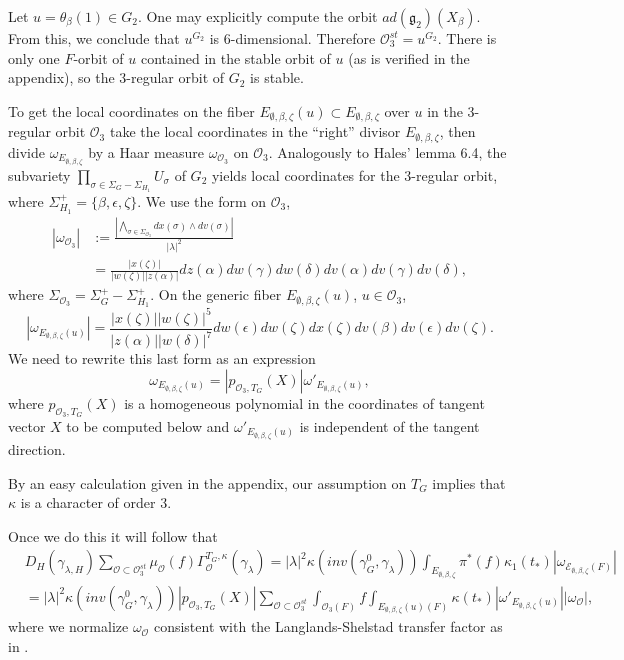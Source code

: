 \documentclass[12pt,letterpaper]{amsart}
\begin{document}
Let $u=\theta_{\beta}(1)\in G_2$.
One may explicitly compute the orbit $ad({\mathfrak g}_2)(X_\beta)$.
From this, we conclude that $u^{G_2}$
is 6-dimensional. Therefore ${\mathcal O}_3^{st}=u^{G_2}$.
There is only one $F$-orbit of $u$ contained in the stable orbit of $u$
(as is verified in the appendix), so the $3$-regular orbit
of $G_2$ is stable.

To get the local coordinates on the fiber
$E_{\emptyset,\beta,\zeta}(u)\subset E_{\emptyset,\beta,\zeta}$ over
$u$ in the 3-regular orbit ${\mathcal O}_3$ take the local
coordinates in the ``right'' divisor $E_{\emptyset,\beta,\zeta}$,
then divide $\omega_{E_{\emptyset,\beta,\zeta}}$ by a Haar measure
$\omega_{{\mathcal O}_3}$ on ${\mathcal O}_3$.
Analogously to Hales' lemma 6.4,
the subvariety $\prod_{\sigma\in \Sigma_G-\Sigma_{H_1}}U_\sigma$
of $G_2$ yields local coordinates for the $3$-regular orbit,
where $\Sigma_{H_1}^+=\{\beta,\epsilon,\zeta\}$.
We use the form on ${\mathcal O}_3$,
\[
\begin{split}
|\omega_{{\mathcal O}_3}|
&:=\frac{|\bigwedge_{\sigma\in \Sigma_{{\mathcal O}_3}}dx(\sigma)\wedge dv(\sigma)|}{|\lambda|^2}\\
&=\frac{|x(\zeta)|}{|w(\zeta)||z(\alpha)|}
dz(\alpha)dw(\gamma)dw(\delta)dv(\alpha)dv(\gamma)dv(\delta),
\end{split}
\tag{8.4}
\]
where $\Sigma_{{\mathcal O}_3}=\Sigma_{G}^+ -\Sigma_{H_1}^+$.
On the generic fiber $E_{\emptyset,\beta,\zeta}(u)$, $u\in {\mathcal O}_3$,
\[
|\omega_{E_{\emptyset,\beta,\zeta}(u)}|=
\frac{{|x(\zeta)||w(\zeta)|^5}}{{|z(\alpha)||w(\delta)|^7}}
dw(\epsilon)dw(\zeta)dx(\zeta)dv(\beta)dv(\epsilon)dv(\zeta).
\tag{8.5}
\]
We need to rewrite this last form as an expression
\[
\omega_{E_{\emptyset,\beta,\zeta}(u)}=
|p_{{\mathcal O}_3,T_G}(X)|\omega'_{E_{\emptyset,\beta,\zeta}(u)},
\]
where $p_{{\mathcal O}_3,T_G}(X)$ is a homogeneous polynomial in the coordinates
of tangent vector $X$ to be computed below
and $\omega'_{E_{\emptyset,\beta,\zeta}(u)}$
is independent of the tangent direction.

By an easy calculation given in the appendix,
our assumption on $T_G$ implies that $\kappa$ is a character
of order $3$.

Once we do this it will follow that
\[
\begin{split}
&D_H(\gamma_{\lambda,H})\sum_{{\mathcal O}\subset {\mathcal O}_3^{st}}
\mu_{\mathcal O}(f)\Gamma_{\mathcal O}^{T_G,\kappa}(\gamma_\lambda)
=|\lambda|^2\kappa(inv(\gamma_G^0,\gamma_\lambda))
\int_{E_{\emptyset,\beta,\zeta}}
\pi^*(f)\kappa_1(t_*)|\omega_{{\mathcal E}_{\emptyset,\beta,\zeta}(F)}|\\
&=|\lambda|^2\kappa(inv(\gamma_G^0,\gamma_\lambda))
|p_{{\mathcal O}_3,T_G}(X)|
\sum_{{\mathcal O}\subset {\mathcal O}_3^{st}}\int_{{\mathcal O}_3(F)}f
\int_{E_{\emptyset,\beta,\zeta}(u)(F)}\kappa(t_*)
|\omega'_{E_{\emptyset,\beta,\zeta}(u)}||\omega_{\mathcal O}|,
\end{split}
\tag{8.6}
\]
where we normalize $\omega_{{\mathcal O}}$ consistent with the
Langlands-Shelstad transfer factor as in \cite{Ha89}.
\end{document}
